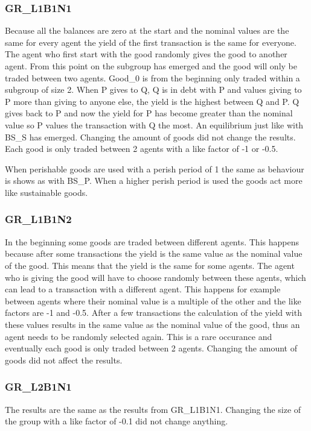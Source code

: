 \documentclass[twoside,openright]{uva-bachelor-thesis}
\begin{document}
\subsubsection{GR\_L1B1N1}
Because all the balances are zero at the start and the nominal values are the same for every agent the yield of the first transaction is the same for everyone. The agent who first start with the good randomly gives the good to another agent. From this point on the subgroup has emerged and the good will only be traded between two agents. Good\_0 is from the beginning only traded within a subgroup of size 2.  When P gives to Q, Q is in debt with P and values giving to P more than giving to anyone else, the yield is the highest between Q and P. Q gives back to P and now the yield for P has become greater than the nominal value so P values the transaction with Q the most. An equilibrium just like with BS\_S has emerged. Changing the amount of goods did not change the results. Each good is only traded between 2 agents with a like factor of -1 or -0.5.

When perishable goods are used with a perish period of 1 the same as behaviour is shows as with BS\_P. When a higher perish period is used the goods act more like sustainable goods. 


\subsubsection{GR\_L1B1N2}
In the beginning some goods are traded between different agents. This happens because after some transactions the yield is the same value as the nominal value of the good. This means that the yield is the same for some agents. The agent who is giving the good will have to choose randomly between these agents, which can lead to a transaction with a different agent. This happens for example between agents where their nominal value is a multiple of the other and the like factors are -1 and -0.5. After a few transactions the calculation of the yield with these values results in the same value as the nominal value of the good, thus an agent needs to be randomly selected again. This is a rare occurance and eventually each good is only traded between 2 agents. Changing the amount of goods did not affect the results.
\subsubsection{GR\_L2B1N1}
The results are the same as the results from GR\_L1B1N1. Changing the size of the group with a like factor of -0.1 did not change anything. 
\end{document}

